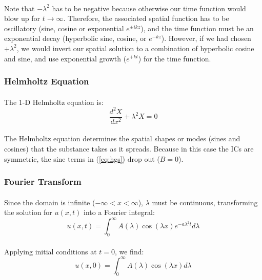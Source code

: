 \paragraph{}
Note that $-\lambda^2$ has to be negative because otherwise our time function would blow up for $t \to \infty$. Therefore, the associated spatial function has to be oscillatory (sine, cosine or exponential $e^{\pm ikz}$), and the time function must be an exponential decay (hyperbolic sine, cosine, or $e^{-kz}$). However, if we had chosen $+\lambda^2$, we would invert our spatial solution to a combination of hyperbolic cosine and sine, and use exponential growth ($e^{+kt}$) for the time function. 

\subsubsection*{Helmholtz Equation}
\paragraph{}
The 1-D Helmholtz equation is:
\begin{equation}
\label{eq:helmholtz1d}
\frac{d^2 X}{dx^2} + \lambda^2 X = 0
\end{equation}
\paragraph{}
The Helmholtz equation determines the spatial shapes or modes (sines and cosines) that the substance takes as it spreads. Because in this case the ICs are symmetric, the sine terms in (\ref{eq:hgs}) drop out ($B=0$). 

\subsubsection*{Fourier Transform}
\paragraph{}
Since the domain is infinite ($-\infty < x < \infty$), $\lambda$ must be continuous, transforming the solution for $u(x,t)$ into a Fourier integral:
\begin{equation}
\label{eq:uxt1}
u(x,t) = \int_{0}^{\infty} A(\lambda) \cos(\lambda x) e^{-a\lambda^2 t} d\lambda
\end{equation}
\paragraph{}
Applying initial conditions at $t=0$, we find:
\begin{equation*}
u(x,0) = \int_{0}^{\infty} A(\lambda) \cos(\lambda x) d\lambda
\end{equation*}
